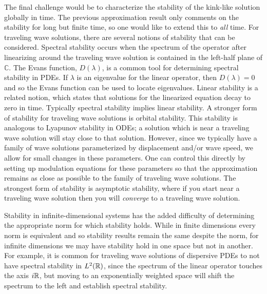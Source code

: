 The final challenge would be to characterize the stability of the kink-like solution globally in time. The previous approximation result only comments on the stability for long but finite time, so one would like to extend this to \emph{all} time. For traveling wave solutions, there are several notions of stability that can be considered. Spectral stability occurs when the spectrum of the operator after linearizing around the traveling wave solution is contained in the left-half plane of \(\mathbb C\). The Evans function, \(D(\lambda)\), is a common tool for determining spectral stability in PDEs. If \(\lambda\) is an eigenvalue for the linear operator, then \(D(\lambda) = 0\) and so the Evans function can be used to locate eigenvalues. Linear stability is a related notion, which states that solutions for the linearized equation decay to zero in time. Typically spectral stability implies linear stability. A stronger form of stability for traveling wave solutions is orbital stability. This stability is analogous to Lyapunov stability in ODEs; a solution which is near a traveling wave solution will stay close to that solution. However, since we typically have a family of wave solutions parameterized by displacement and/or wave speed, we allow for small changes in these parameters. One can control this directly by setting up modulation equations for these parameters so that the approximation remains as close as possible to the family of traveling wave solutions. The strongest form of stability is asymptotic stability, where if you start near a traveling wave solution then you will \emph{converge} to a traveling wave solution.

Stability in infinite-dimensional systems has the added difficulty of determining the appropriate norm for which stability holds. While in finite dimensions every norm is equivalent and so stability results remain the same despite the norm, for infinite dimensions we may have stability hold in one space but not in another.  For example, it is common for traveling wave solutions of dispersive PDEs to not have spectral stability in \(L^2(\mathbb{R})\), since the spectrum of the linear operator touches the axis \(i \mathbb{R}\), but moving to an exponentially weighted space will shift the spectrum to the left and establish spectral stability.

